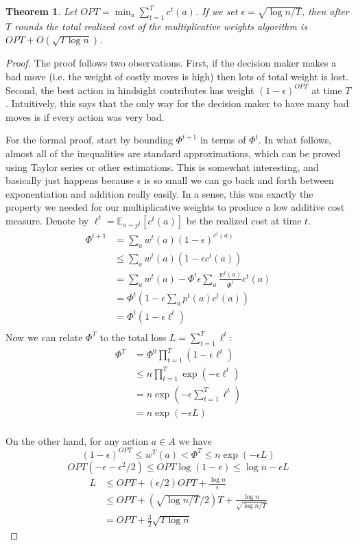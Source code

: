\documentclass[12pt]{article}
\newcommand{\Es}[2]{\mathbb{E}_{#1}\left[{#2}\right]}
\newtheorem{theorem}[definition]{Theorem}
\begin{document}
\begin{theorem}
  Let $OPT = \min_a \sum_{t=1}^T c^t(a)$.
  If we set $\epsilon = \sqrt{\log n/T}$, then after $T$ rounds the total realized
  cost of the multiplicative weights algorithm is $OPT + O(\sqrt{T\log n})$.
\end{theorem}
\begin{proof}
  The proof follows two observations.
  First, if the decision maker makes a bad move
  (i.e. the weight of costly moves is high) then lots of total weight is lost.
  Second, the best action in hindsight contributes has weight
  $(1-\epsilon)^{OPT}$ at time $T$.
  Intuitively, this says that the only way for the decision maker to have many 
  bad moves is if every action was very bad.

  For the formal proof, start by bounding $\Phi^{t+1}$ in terms of $\Phi^t$.
  In what follows, almost all of the inequalities are standard approximations,
  which can be proved using Taylor series or other estimations.
  This is somewhat interesting, and basically just happens because $\epsilon$ is
  so small we can go back and forth between exponentiation and addition really
  easily. In a sense, this was exactly the property we needed for our
  multiplicative weights to produce a low additive cost measure.
  Denote by $\ell^t = \Es{a\sim p^t}{c^t(a)}$ be the realized cost at time $t$.
  \begin{align*}
    \Phi^{t+1}
      & = \sum_a w^t(a)(1 - \epsilon)^{c^t(a)} \\
      & \le \sum_a w^t(a)(1 - \epsilon c^t(a)) \\
      & = \sum_a w^t(a) - \Phi^t \epsilon \sum_a \frac{w^t(a)}{\Phi^t} c^t(a) \\
      & = \Phi^t \left( 1 -\epsilon \sum_a p^t(a) c^t(a) \right) \\
      & = \Phi^t \left( 1 -\epsilon \ell^t \right) \\
  \end{align*}
  Now we can relate $\Phi^T$ to the total loss $L = \sum_{t=1}^T \ell^t$:
  \begin{align*}
    \Phi^T
      & = \Phi^0 \prod_{t=1}^T \left( 1 -\epsilon \ell^t \right) \\
      & \le n \prod_{t=1}^T \exp\left(-\epsilon \ell^t \right) \\
      & = n \exp\left(-\epsilon \sum_{t=1}^T \ell^t \right) \\
      & = n \exp\left(-\epsilon L\right) \\
  \end{align*}

  On the other hand, for any action $a\in A$ we have
  \[ (1-\epsilon)^{OPT} \le w^T(a) < \Phi^T \le n\exp(-\epsilon L) \]
  \[ OPT(-\epsilon - \epsilon^2/2) \le OPT\log(1 - \epsilon) 
    \le \log n - \epsilon L \]
  \begin{align*} 
    L & \le OPT + ({\epsilon}/{2}) OPT + \frac{\log n}{\epsilon} \\
      & \le OPT + (\sqrt{\log n/T}/{2}) T + \frac{\log n}{\sqrt{\log n/T}} \\
      & = OPT + \frac{3}{2} \sqrt{T\log n}
  \end{align*}

\end{proof}
\end{document}

